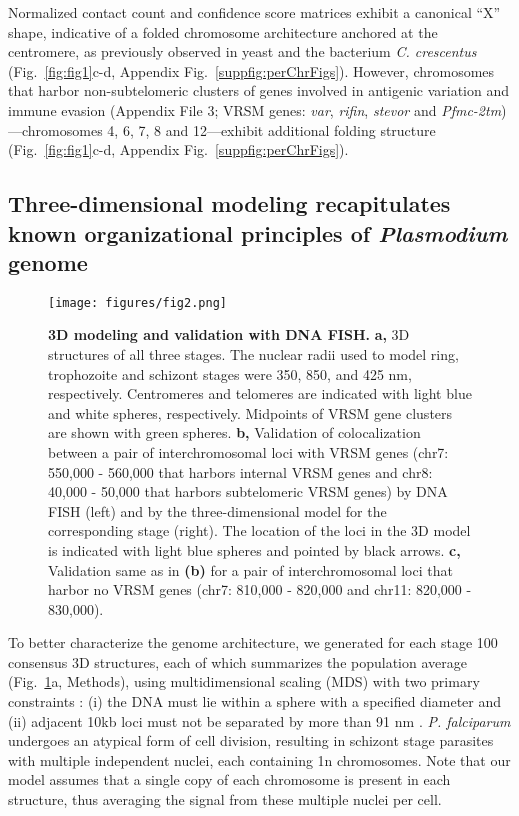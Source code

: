 Normalized contact count and confidence score matrices exhibit a canonical
``X'' shape, indicative of a folded chromosome architecture anchored at the
centromere, as previously observed in yeast \citep{duan:three,
tanizawa:mapping} and the bacterium {\em C. crescentus}
\citep{umbarger:three-dimensional} (Fig.~\ref{fig:fig1}c-d, Appendix
Fig.~\ref{suppfig:perChrFigs}). However, chromosomes that harbor
non-subtelomeric clusters of genes involved in antigenic variation and immune
evasion (Appendix File 3; VRSM genes: {\em var}, {\em rifin}, {\em
stevor} and {\em Pfmc-2tm})---chromosomes 4, 6, 7, 8 and 12---exhibit
additional folding structure (Fig.~\ref{fig:fig1}c-d, Appendix
Fig.~\ref{suppfig:perChrFigs}).

\subsection{Three-dimensional modeling recapitulates known organizational principles of {\em Plasmodium} genome}

\begin{figure}[h]
\centering
\texttt{[image: figures/fig2.png]}
\caption{{\bf 3D modeling and validation with DNA FISH.}
 \textbf{a,} 3D structures of all three stages. The nuclear radii used to
 model ring, trophozoite and schizont stages were 350, 850, and 425 nm,
 respectively. Centromeres and telomeres are indicated with light blue and
 white spheres, respectively. Midpoints of VRSM gene clusters are shown with
 green spheres. \textbf{b,} Validation of colocalization between a pair of
 interchromosomal loci with VRSM genes (chr7: 550,000 - 560,000 that harbors
 internal VRSM genes and chr8: 40,000 - 50,000 that harbors subtelomeric VRSM
 genes) by DNA FISH (left) and by the three-dimensional model for the
 corresponding stage (right). The location of the loci in the 3D model is
 indicated with light blue spheres and pointed by black arrows. \textbf{c,}
 Validation same as in \textbf{(b)} for a pair of interchromosomal loci that
 harbor no VRSM genes (chr7: 810,000 - 820,000 and chr11: 820,000 - 830,000).
 }
 \label{fig:fig2}
 \end{figure}




To better characterize the genome architecture, we generated for each stage
100 consensus 3D structures, each of which summarizes the population average
(Fig.~\ref{fig:fig2}a, Methods), using multidimensional scaling (MDS) with two
primary constraints \citep{duan:three}: (i) the DNA must lie within a sphere
with a specified diameter \citep{bannister:making, weiner:3d} and (ii)
adjacent 10kb loci must not be separated by more than 91 nm
\citep{bystricky:long-range}. \emph{P. falciparum} undergoes an atypical form
of cell division, resulting in schizont stage parasites with multiple
independent nuclei, each containing 1n chromosomes. Note that our model
assumes that a single copy of each chromosome is present in each structure,
thus averaging the signal from these multiple nuclei per cell.


